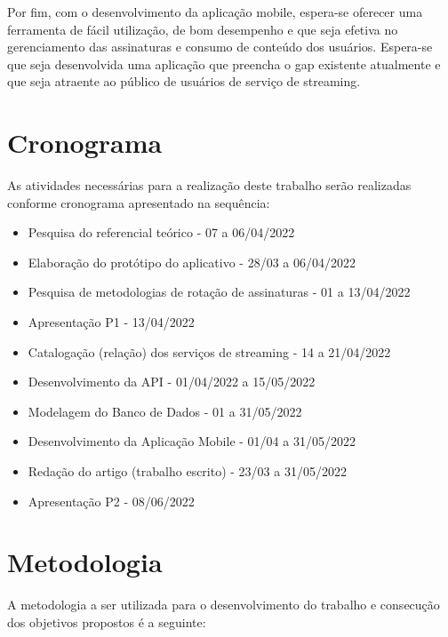 \documentclass[conference]{IEEEtran}
\begin{document}
Por fim, com o desenvolvimento da aplicação mobile, espera-se oferecer uma ferramenta de fácil utilização, de bom desempenho e que seja efetiva no gerenciamento das assinaturas e consumo de conteúdo dos usuários. Espera-se que seja desenvolvida uma aplicação que preencha o gap existente atualmente e que seja atraente ao público de usuários de serviço de streaming. 

\section{Cronograma}

As atividades necessárias para a realização deste trabalho serão realizadas conforme cronograma apresentado na sequência:

\begin{itemize}
\item Pesquisa do referencial teórico - 07 a 06/04/2022
\item Elaboração do protótipo do aplicativo - 28/03 a 06/04/2022
\item Pesquisa de metodologias de rotação de assinaturas - 01 a 13/04/2022
\item Apresentação P1 - 13/04/2022
\item Catalogação (relação) dos serviços de streaming - 14 a 21/04/2022
\item Desenvolvimento da API - 01/04/2022 a 15/05/2022
\item Modelagem do Banco de Dados - 01 a 31/05/2022
\item Desenvolvimento da Aplicação Mobile - 01/04 a 31/05/2022
\item Redação do artigo (trabalho escrito) - 23/03 a 31/05/2022
\item Apresentação P2 - 08/06/2022
\end{itemize}

\section{Metodologia}

A metodologia a ser utilizada para o desenvolvimento do trabalho e consecução dos objetivos propostos é a seguinte:
\end{document}
